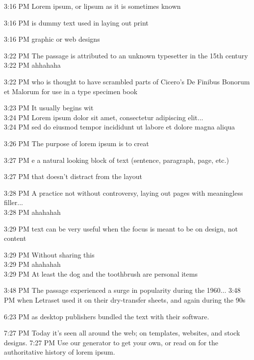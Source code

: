 \documentclass{article}
\begin{document}


    
\begin{chat}

3:16 PM Lorem ipsum, or lipsum as it is sometimes known

3:16 PM is dummy text used in laying out print

3:16 PM graphic or web designs

3:22 PM The passage is attributed to an unknown typesetter in the 15th century\\
3:22 PM ahhahaha

3:22 PM who is thought to have scrambled parts of Cicero's De Finibus Bonorum et Malorum for use in a type specimen book

3:23 PM It usually begins wit\\
3:24 PM Lorem ipsum dolor sit amet, consectetur adipiscing elit...\\
3:24 PM sed do eiusmod tempor incididunt ut labore et dolore magna aliqua

3:26 PM The purpose of lorem ipsum is to creat

3:27 PM e a natural looking block of text (sentence, paragraph, page, etc.)

3:27 PM that doesn't distract from the layout

3:28 PM A practice not without controversy, laying out pages with meaningless filler...\\
3:28 PM ahahahah

3:29 PM text can be very useful when the focus is meant to be on design, not content

3:29 PM Without sharing this \\
3:29 PM ahahahah\\
3:29 PM At least the dog and the toothbrush are personal items

3:48 PM The passage experienced a surge in popularity during the 1960...
3:48 PM when Letraset used it on their dry-transfer sheets, and again during the 90s

6:23 PM as desktop publishers bundled the text with their software.

7:27 PM Today it's seen all around the web; on templates, websites, and stock designs.
7:27 PM Use our generator to get your own, or read on for the authoritative history of lorem ipsum. 


\end{chat}
\end{document}
